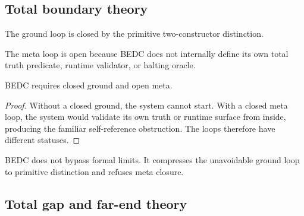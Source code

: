 
\subsection{Total boundary theory}
\label{subsec:philosophy-total-boundary}

\begin{definition}
\label{def:philosophy-closed-ground-loop-total}
The ground loop is closed by the primitive two-constructor distinction.
\end{definition}

\begin{definition}
\label{def:philosophy-open-meta-loop-total}
The meta loop is open because BEDC does not internally define its own
total truth predicate, runtime validator, or halting oracle.
\end{definition}

\begin{theorem}
\label{thm:philosophy-two-loop-synthesis-total}
BEDC requires closed ground and open meta.
\end{theorem}
\begin{proof}
Without a closed ground, the system cannot start. With a closed meta
loop, the system would validate its own truth or runtime surface from
inside, producing the familiar self-reference obstruction. The loops
therefore have different statuses.
\end{proof}

\begin{corollary}
\label{cor:philosophy-minimal-ground-contribution}
BEDC does not bypass formal limits. It compresses the unavoidable
ground loop to primitive distinction and refuses meta closure.
\end{corollary}


\subsection{Total gap and far-end theory}
\label{subsec:philosophy-total-gap-far-end}

